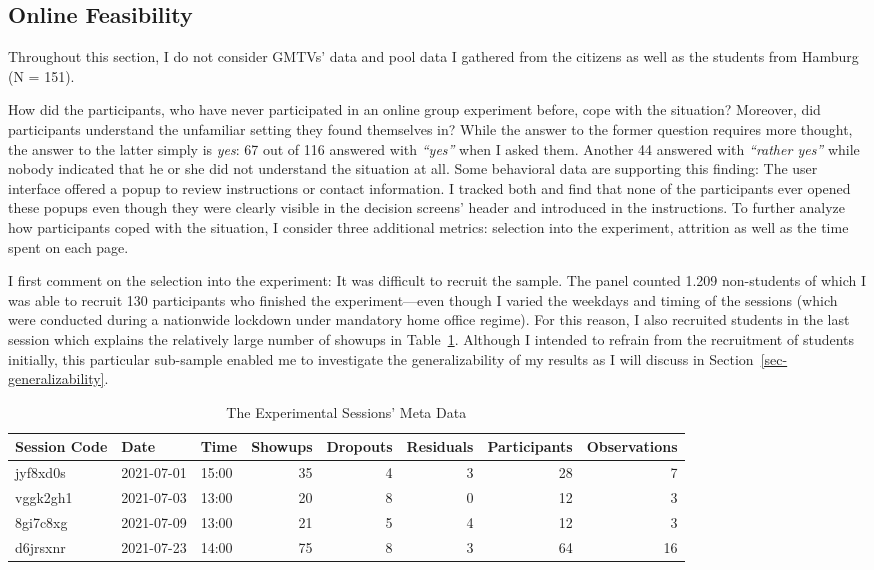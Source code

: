 \documentclass[
  authoryear,
  review,
  3p,
  onecolumn]{elsarticle}
\begin{document}
\hypertarget{sec-feasibility}{%
\subsection{Online Feasibility}\label{sec-feasibility}}

Throughout this section, I do not consider GMTVs' data and pool data I
gathered from the citizens as well as the students from Hamburg (N =
151).

How did the participants, who have never participated in an online group
experiment before, cope with the situation? Moreover, did participants
understand the unfamiliar setting they found themselves in? While the
answer to the former question requires more thought, the answer to the
latter simply is \emph{yes}: 67 out of 116 answered with \emph{``yes''}
when I asked them. Another 44 answered with \emph{``rather yes''} while
nobody indicated that he or she did not understand the situation at all.
Some behavioral data are supporting this finding: The user interface
offered a popup to review instructions or contact information. I tracked
both and find that none of the participants ever opened these popups
even though they were clearly visible in the decision screens' header
and introduced in the instructions. To further analyze how participants
coped with the situation, I consider three additional metrics: selection
into the experiment, attrition as well as the time spent on each page.

I first comment on the selection into the experiment: It was difficult
to recruit the sample. The panel counted 1.209 non-students of which I
was able to recruit 130 participants who finished the experiment---even
though I varied the weekdays and timing of the sessions (which were
conducted during a nationwide lockdown under mandatory home office
regime). For this reason, I also recruited students in the last session
which explains the relatively large number of showups in
Table~\ref{tbl-meta}. Although I intended to refrain from the
recruitment of students initially, this particular sub-sample enabled me
to investigate the generalizability of my results as I will discuss in
Section~\ref{sec-generalizability}.

\hypertarget{tbl-meta}{}
\begin{table}
\caption{\label{tbl-meta}The Experimental Sessions' Meta Data }\tabularnewline

\centering
\begin{tabular}{l|l|l|r|r|r|r|r}
\hline
Session Code & Date & Time & Showups & Dropouts & Residuals & Participants & Observations\\
\hline
jyf8xd0s & 2021-07-01 & 15:00 & 35 & 4 & 3 & 28 & 7\\
\hline
vggk2gh1 & 2021-07-03 & 13:00 & 20 & 8 & 0 & 12 & 3\\
\hline
8gi7c8xg & 2021-07-09 & 13:00 & 21 & 5 & 4 & 12 & 3\\
\hline
d6jrsxnr & 2021-07-23 & 14:00 & 75 & 8 & 3 & 64 & 16\\
\hline
\end{tabular}
\end{table}
\end{document}
